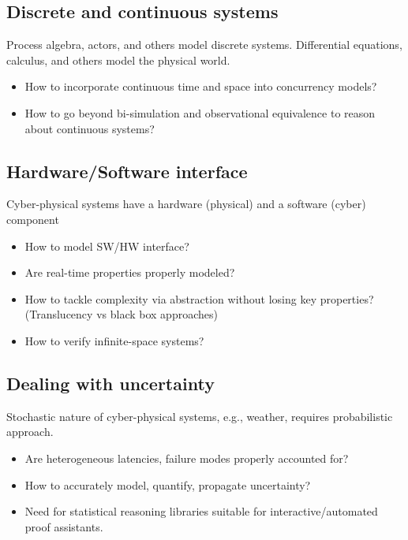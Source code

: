 \documentclass[
graybox,
envcountchap
]{svmult}
\begin{document}
\begin{bibunit}
    \subsection{Discrete and continuous systems}

    Process algebra, actors, and others model discrete systems.
    Differential equations, calculus, and others model the physical world.

    \begin{itemize}
    \item How to incorporate continuous time and space into concurrency models?
    \item How to go beyond bi-simulation and observational equivalence to reason about continuous systems?
    \end{itemize}
    
    \subsection{Hardware/Software interface}

    Cyber-physical systems have a hardware (physical) and a software (cyber) component
    
    \begin{itemize}
    \item How to model SW/HW interface?
    \item Are real-time properties properly modeled?
    \item  How to tackle complexity via abstraction without losing key properties?  (Translucency vs black box approaches)
    \item How to verify infinite-space systems?
    \end{itemize}

    \subsection{Dealing with uncertainty}

    Stochastic nature of cyber-physical systems, e.g., weather, requires probabilistic approach.
    
    \begin{itemize}
    \item Are heterogeneous latencies, failure modes properly accounted for?
    \item How to accurately model, quantify, propagate uncertainty?
    \item Need for statistical reasoning libraries suitable for interactive/automated proof assistants.
    \end{itemize}


\end{bibunit}
\end{document}
